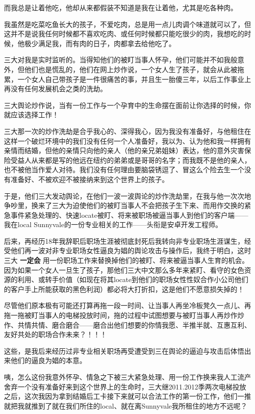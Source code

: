 \documentclass[9pt, b5paper]{article}
\begin{document}
而我总是让着他吃，他却从来都假装不知道是我在让着他，尤其是吃各种肉。

我虽然是吃菜吃鱼长大的孩子，不爱吃肉，总是用一点儿肉调个味道就可以了，但这并不是说我任何时候都不喜欢吃肉、或任何时候都只能吃很少的肉，我想吃的时候，他极少满足我，而有肉的日子，肉都拿去给他吃了。 


三大对我是实时监听的。当得知他们的被盯当事人怀孕，他们可能并不如我般意外，但他们也是慌乱的，他们在网上炒作说，一个女人生了孩子，就会从此被拖累，一个女人自己带孩子是一件很痛苦的事，并且生一胎傻三年，以后工作事业上再没有任何发展机会之类的洗劫。

三大舆论炒作说，当有一份工作与一个孕育中的生命摆在面前让你选择的时候，你就应该选择工作！

三大那一次的炒作洗劫是合乎我心的、深得我心，因为我没有准备好，与他租住在这样一个破烂环境中的我们没有任何一个人准备好，我以为、认为他和我一样拥有亲情而结婚，但他的亲情只向他的亲人（他的亲兄弟姐妹）表达，他的意外灾害保险受益人从来都是写的他远在纽约的弟弟或是哥哥的名字；而我既不是他的亲人，也不被他当作爱人对待。我们没有任何理由要脑袋锈逗了、冒这么个险去生一个没有准备好、不被欢迎不被接纳来到这个世界上的孩子。 

于是，他们三大发动舆论，在他们一波一波舆论的炒作洗劫里，在我与他一次次地争吵里，换来了三大为迫使他们的被盯当事人不会把孩子生下来、而用作交换的紧急事件紧急处理的、快速locate被盯、将来被职场被逼当事人到他们的客户端——我在local Sunnyvale的一份专业相关的工作——头衔是安卓开发工程师。

后来，再经历18年我辞职后职场生涯被彻底封死后我转向非专业职场生涯谋生，经受他们再一波对非专业职场女性逼良为娼的舆论攻击与操作后，我终于明白，这时三大 \textbf{一定会} 用一份职场工作来替换掉他们的被盯、将来被逼当事人生育的机会。因为如果一个女人一旦生了孩子，那他们三大中文那么多年来紧盯、看守的女色资源的利用、或转手价值（如现在将其locate到他们的职场女性性奴合作小公司他们的客户手上所能获取的黑色利润）都必将大打折扣，这是他们不愿意损失掉的！

尽管他们原本极有可能还打算再拖一段一时间、让当事人再坐冷板凳久一点儿、再拖一拖被盯当事人的电梯投放时间，拖的过程中试图想要与被盯当事人再炒作炒作、共情共情、磨合磨合——磨合出他们想要的你情我愿、半推半就、互惠互利、友好共处的职场合作未来？！！！

这些，是我后来经历过非专业相关职场再受遭受到三在舆论的逼迫与攻击后体悟出来他们的逼良为娼的本意。 

咦，怎么这份我意外怀孕、情急之下被三大紧急处理、用一份工作换来我人工流产舍弃一个没有准备好来到这个世界上的生命时，三大继2011.2012季两次电梯投放之后，这次我因为拿到结婚后工卡接下来就可以合法工作的第一份工作，他们一推就把我就推到了就在我们所住的local、就在离Sunnyvale我所租住的地方不远呢？
\end{document}
